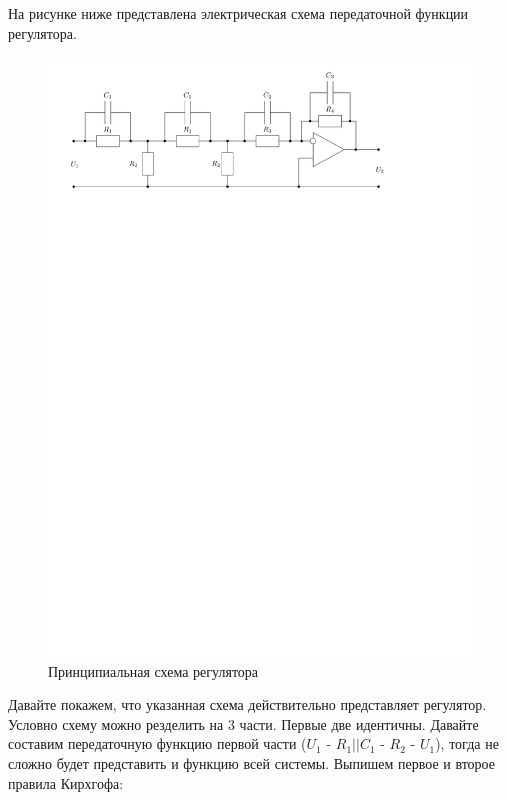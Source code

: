 \documentclass[russian, utf8]{eskdtext}
\begin{document}
На рисунке ниже представлена электрическая схема передаточной функции регулятора.
\begin{figure}[h!]
    \centering
    \includegraphics {images/PrincipScheme.pdf}
    \caption{Принципиальная схема регулятора}
\end{figure}

Давайте покажем, что указанная схема действительно представляет регулятор. Условно схему можно резделить на 3 части. Первые две идентичны. Давайте составим передаточную функцию первой части ($U_1$ - $R_1 || C_1$ - $R_2$ - $U_1$), тогда не сложно будет представить и функцию всей системы. Выпишем первое и второе правила Кирхгофа:
\end{document}
